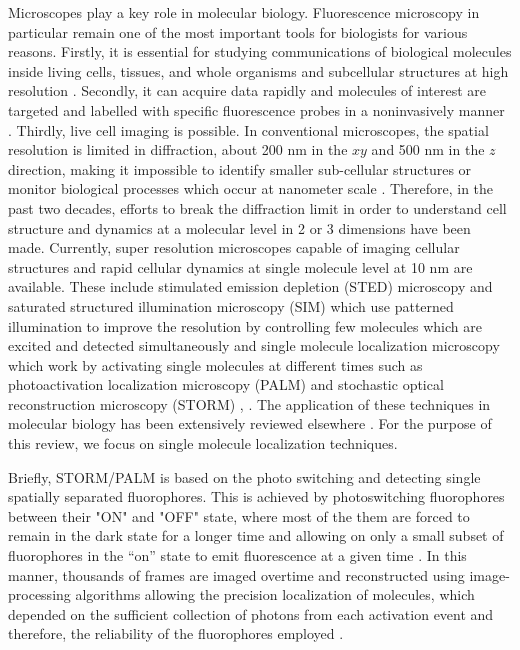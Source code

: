 Microscopes play a key role in molecular biology. Fluorescence microscopy in particular remain one of the most important tools for biologists for various reasons. Firstly, it is essential for studying communications of biological molecules inside living cells, tissues, and whole organisms and subcellular structures at high resolution \citep{Han2013}. Secondly, it can acquire data rapidly and molecules of interest are targeted and labelled with specific fluorescence probes in a noninvasively manner \citep{Han2013}. Thirdly, live cell imaging is possible. In conventional microscopes, the spatial resolution is limited in diffraction, about 200 nm in the $xy$ and 500 nm in the $z$ direction, making it impossible to identify smaller sub-cellular structures or monitor biological processes which occur at nanometer scale \citep{Xu2017}. Therefore, in the past two decades, efforts to break the diffraction limit in order to understand cell structure and dynamics at a molecular level in 2 or 3 dimensions have been made. Currently, super resolution microscopes capable of imaging cellular structures and rapid cellular dynamics at single molecule level at 10 nm are available. These include stimulated emission depletion (STED) microscopy \citep{Klar1999} and saturated structured illumination microscopy (SIM) \citep{Gustafsson2005} which use patterned illumination to improve the resolution by controlling few molecules which are excited and detected simultaneously and single molecule localization microscopy which work by activating single molecules at different times \citep{Han2013} such as  photoactivation localization microscopy (PALM) \citep{Betzig2006} and stochastic optical reconstruction microscopy (STORM) \citep{Huang2008,Xu2017}, . The application of these techniques in molecular biology has been extensively reviewed elsewhere \citep{Han2013}. For the purpose of this review, we focus on single molecule localization techniques.  

Briefly, STORM/PALM is based on the photo switching and detecting single spatially separated fluorophores. This is achieved by photoswitching  fluorophores between their  "ON" and "OFF" state, where most of the them are forced to remain in the dark state for a longer time and allowing on only a small subset of fluorophores  in  the “on” state to emit fluorescence at a given time \citep{Turkowyd2016}. In this manner, thousands of frames are imaged overtime  and reconstructed using image-processing algorithms allowing the precision localization of molecules, which depended on the sufficient collection of photons from each activation event and therefore, the reliability of the fluorophores employed \citep{Turkowyd2016,Xu2017}.

